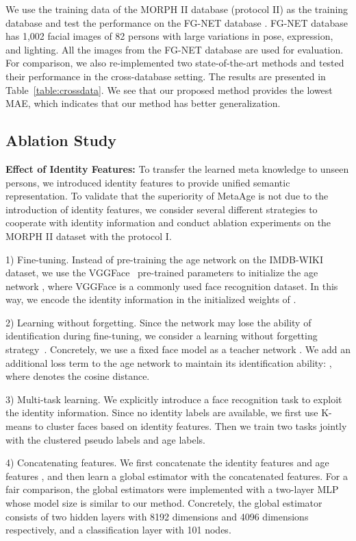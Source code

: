 \documentclass[journal,twoside]{IEEEtran}
\begin{document}
We use the training data of the MORPH II database (protocol II) as the training database and test the performance on the FG-NET database \cite{panis2016overview}. FG-NET database \cite{panis2016overview} has 1,002 facial images of 82 persons with large variations in pose, expression, and lighting. All the images from the FG-NET database are used for evaluation. For comparison, we also re-implemented two state-of-the-art methods and tested their performance in the cross-database setting. The results are presented in Table~\ref{table:crossdata}. We see that our proposed method provides the lowest MAE, which indicates that our method has better generalization.


\subsection{Ablation Study}
\textbf{Effect of Identity Features:} To transfer the learned meta knowledge to unseen persons, we introduced identity features to provide unified semantic representation. To validate that the superiority of MetaAge is not due to the introduction of identity features, we consider several different strategies to cooperate with identity information and conduct ablation experiments on the MORPH II dataset with the protocol I.


1) Fine-tuning. Instead of pre-training the age network  on the IMDB-WIKI dataset, we use the  VGGFace~\cite{parkhi2015deep} pre-trained parameters to initialize the age network , where VGGFace is a commonly used face recognition dataset. In this way, we encode the identity information in the initialized weights of .


2) Learning without forgetting. Since the network may lose the ability of identification during fine-tuning, we consider a learning without forgetting strategy~\cite{li2017learningwf}. Concretely, we use a fixed face model as a teacher network . We add an additional loss term to the age network  to maintain its identification ability: , where  denotes the cosine distance.

3) Multi-task learning. We explicitly introduce a face recognition task to exploit the identity information. Since no identity labels are available, we first use K-means to cluster faces based on identity features. Then we train two tasks jointly with the clustered pseudo labels and age labels.

4) Concatenating features. We first concatenate the identity features  and age features , and then learn a global estimator with the concatenated features. For a fair comparison, the global estimators were implemented with a two-layer MLP whose model size is similar to our method. Concretely, the global estimator consists of two hidden layers with 8192 dimensions and 4096 dimensions respectively, and a classification layer with 101 nodes.
\end{document}
